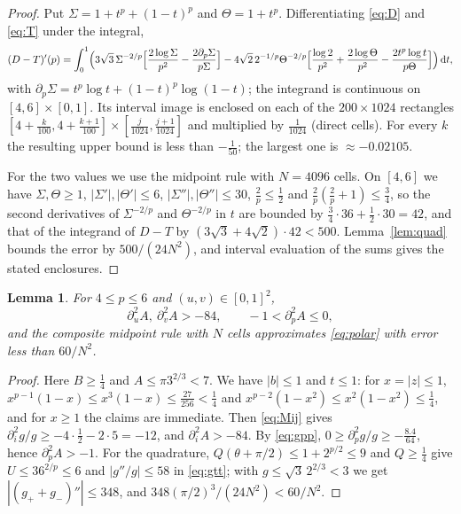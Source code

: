 \documentclass[11pt]{amsart}
\newtheorem{lemma}[theorem]{Lemma}
\theoremstyle{definition}
\theoremstyle{remark}
\numberwithin{equation}{section}
\newcommand{\dd}{\,\mathrm{d}}
\begin{document}
\begin{proof}
Put $\Sigma=1+t^p+(1-t)^p$ and $\Theta=1+t^p$. Differentiating \eqref{eq:D} and \eqref{eq:T} under the integral,
\[
(D-T)'(p)=\int_0^1\Bigl(3\sqrt3\,\Sigma^{-2/p}\Bigl[\frac{2\log\Sigma}{p^2}-\frac{2\partial_p\Sigma}{p\Sigma}\Bigr]-4\sqrt2\,2^{-1/p}\Theta^{-2/p}\Bigl[\frac{\log2}{p^2}+\frac{2\log\Theta}{p^2}-\frac{2t^p\log t}{p\Theta}\Bigr]\Bigr)\dd t,
\]
with $\partial_p\Sigma=t^p\log t+(1-t)^p\log(1-t)$; the integrand is continuous on $[4,6]\times[0,1]$. Its interval image is enclosed on each of the $200\times1024$ rectangles $[4+\frac k{100},4+\frac{k+1}{100}]\times[\frac j{1024},\frac{j+1}{1024}]$ and multiplied by $\frac1{1024}$ (direct cells). For every $k$ the resulting upper bound is less than $-\frac1{50}$; the largest one is $\approx-0.02105$.

For the two values we use the midpoint rule with $N=4096$ cells. On $[4,6]$ we have $\Sigma,\Theta\ge1$, $|\Sigma'|,|\Theta'|\le6$, $|\Sigma''|,|\Theta''|\le30$, $\frac2p\le\frac12$ and $\frac2p(\frac2p+1)\le\frac34$, so the second derivatives of $\Sigma^{-2/p}$ and $\Theta^{-2/p}$ in $t$ are bounded by $\frac34\cdot36+\frac12\cdot30=42$, and that of the integrand of $D-T$ by $(3\sqrt3+4\sqrt2)\cdot42<500$. Lemma~\ref{lem:quad} bounds the error by $500/(24N^2)$, and interval evaluation of the sums gives the stated enclosures.
\end{proof}

\begin{lemma}\label{lem:46constants}
For $4\le p\le6$ and $(u,v)\in[0,1]^2$,
\[
\partial_u^2A,\ \partial_v^2A>-84,\qquad -1<\partial_p^2A\le0,
\]
and the composite midpoint rule with $N$ cells approximates \eqref{eq:polar} with error less than $60/N^2$.
\end{lemma}

\begin{proof}
Here $B\ge\frac14$ and $A\le\pi3^{2/3}<7$. We have $|b|\le1$ and $t\le1$: for $x=|z|\le1$, $x^{p-1}(1-x)\le x^3(1-x)\le\frac{27}{256}<\frac14$ and $x^{p-2}(1-x^2)\le x^2(1-x^2)\le\frac14$, and for $x\ge1$ the claims are immediate. Then \eqref{eq:Mij} gives $\partial_i^2g/g\ge-4\cdot\frac12-2\cdot5=-12$, and $\partial_i^2A>-84$. By \eqref{eq:gpp}, $0\ge\partial_p^2g/g\ge-\frac{8.4}{64}$, hence $\partial_p^2A>-1$. For the quadrature, $Q(\theta+\pi/2)\le1+2^{p/2}\le9$ and $Q\ge\frac14$ give $U\le36^{2/p}\le6$ and $|g''/g|\le58$ in \eqref{eq:gtt}; with $g\le\sqrt3\,2^{2/3}<3$ we get $|(g_++g_-)''|\le348$, and $348(\pi/2)^3/(24N^2)<60/N^2$.
\end{proof}
\end{document}
